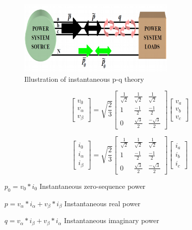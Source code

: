 \documentclass[journal,twoside]{IEEEtran}
\begin{document}
\begin{figure}[!ht]
\centering
\includegraphics[width=3in]{4}
\caption{Illustration of instantaneous p-q theory}
\label{f4}
\end{figure}




\[ \begin{bmatrix} v_0 \\ v_{\alpha} \\v_{\beta} \end{bmatrix}
=\sqrt{\frac{2}{3}} \begin{bmatrix} \frac{1}{\sqrt 2} & \frac{1}{\sqrt 2} &\frac{1}{\sqrt 2}\\ 1 & \frac{-1}{2} & \frac{-1}{2}\\ 0 & \frac{\sqrt 3}{2} & \frac{-\sqrt 3}{2} \end{bmatrix} \begin{bmatrix} v_a \\ v_b \\ v_c \end{bmatrix} \] 


\[ \begin{bmatrix} i_0 \\ i_{\alpha} \\i_{\beta} \end{bmatrix}
=\sqrt{\frac{2}{3}} \begin{bmatrix} \frac{1}{\sqrt 2} & \frac{1}{\sqrt 2} &\frac{1}{\sqrt 2}\\ 1 & \frac{-1}{2} & \frac{-1}{2}\\ 0 & \frac{\sqrt 3}{2} & \frac{-\sqrt 3}{2} \end{bmatrix} \begin{bmatrix} i_a \\ i_b \\ i_c \end{bmatrix} \] 

$p_0=v_0*i_0$ Instantaneous zero-sequence power

$p= v_{\alpha}*i_{\alpha}+v_{\beta}*i_{\beta}$ Instantaneous real power

$ q= v_{\alpha}*i_{\beta}+v_{\beta}*i_{\alpha}$ Instantaneous imaginary power
\end{document}

